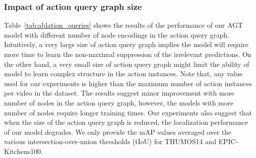 \documentclass[10pt,twocolumn,letterpaper]{article}
\begin{document}
\subsubsection{Impact of action query graph size}
\label{subsec:ablation_queries}
Table~\ref{tab:ablation_queries} shows the results of the performance of our AGT model with different number of node encodings in the action query graph. Intuitively, a very large size of action query graph implies the model will require more time to learn the non-maximal suppression of the irrelevant predictions. On the other hand, a very small size of action query graph might limit the ability of model to learn complex structure in the action instances. Note that, any value used for our experiments is higher than the maximum number of action instances per video in the dataset. The results suggest minor improvement with more number of nodes in the action query graph, however, the models with more number of nodes require longer training times. Our experiments also suggest that when the size of the action query graph is reduced, the localization performance of our model degrades. We only provide the mAP values averaged over the various intersection-over-union thresholds (tIoU) for THUMOS14 and EPIC-Kitchens100.
\setlength{\tabcolsep}{4pt}
\renewcommand{\arraystretch}{1}
\begin{table}[!t]
\centering
\caption{\textbf{Impact of action query graph size.} We report performance of our AGT model with different number of nodes in the action query graph. We report mAP for evaluation performance (higher is better). EPIC (A), EPIC (V), EPIC (N) indicates task `Action', `Verb', `Noun' classification on EPIC-Kitchens100. \#queries indicates number of nodes in the action query graph.}
\vspace{-1mm}
\label{tab:ablation_queries}
\end{table}
 
\end{document}
